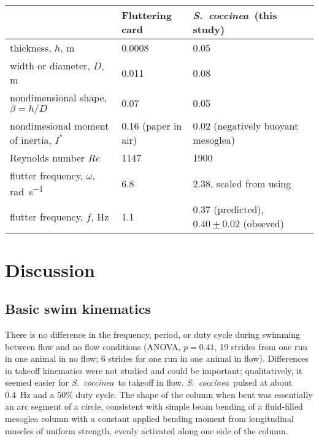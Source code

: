 \documentclass[10pt]{article}
\newcommand{\Genus}[1]{\emph{#1}}
\newcommand{\Stomphiacoccinea}{\Genus{Stomphia coccinea}}
\newcommand{\Scoccinea}{\Genus{S.~coccinea}}
\newcommand{\Stomphia}{\Genus{S.~coccinea}}
\begin{document}
\begin{table*}
\caption{Comparison of flutter frequency using nondimensionalized swim parameters, after \citep{Pesavento:2004, Andersen:2005, Andersen:2005a, Taylor:2003}.  Based on the parameters $\beta$ and $I^*$, the phase diagrams of tables of \citet{Pesavento:2004} suggest \Stomphiacoccinea\ is in a region where flutter is expected to occur.  When the flutter frequency observed in \citep{Pesavento:2004} is scaled using the scaling of \citep{Mahadevan:1999}, $\omega \sim h^{0.5}D^{-1}$, the swim frequency observed in \Scoccinea\ is observed.}
\begin{center}
\begin{tabular}{lll}
		& Fluttering card \citep{Pesavento:2004}	& \Scoccinea\ (this study) \\
		\hline
thickness, $h$, \si{\meter}			& 0.0008			& 0.05 \\
width or diameter, $D$, \si{\meter}		& 0.011			& 0.08 \\
nondimensional shape, $\beta=h/D$ & 0.07		& 0.05 \\
nondimesional moment of inertia, $I^*$ & 0.16 (paper in air) & 0.02 (negatively buoyant mesoglea) \\
Reynolds number $Re$ & 1147	& 1900 \\
flutter frequency, $\omega$, \si{\radian\per\second}	& 6.8	 	& 2.38, scaled from \citep{Pesavento:2004} using \citep{Mahadevan:1999} \\
flutter frequency, $f$, \si{\hertz} & 1.1 & 0.37 (predicted), $0.40 \pm 0.02$ (obseved)\\
\hline
\end{tabular}
\end{center}
\label{table:3} 
\end{table*}

\section*{Discussion}
\subsection*{Basic swim kinematics}
	There is no difference in the frequency, period, or duty cycle during swimming between flow and no flow conditions (ANOVA, $p=0.41$, 19 strides from one run in one animal in no flow; 6 strides for one run in one animal in flow).  Differences in takeoff kinematics were not studied and could be important; qualitatively, it seemed easier for \Stomphia\ to takeoff in flow.  \Stomphia\ pulsed at about \SI{0.4}{\hertz} and a 50\% duty cycle.  The shape of the column when bent was essentially an arc segment of a circle, consistent with simple beam bending of a fluid-filled mesoglea column with a constant applied bending moment from longitudinal muscles of uniform strength, evenly activated along one side of the column. 
	
\end{document}
